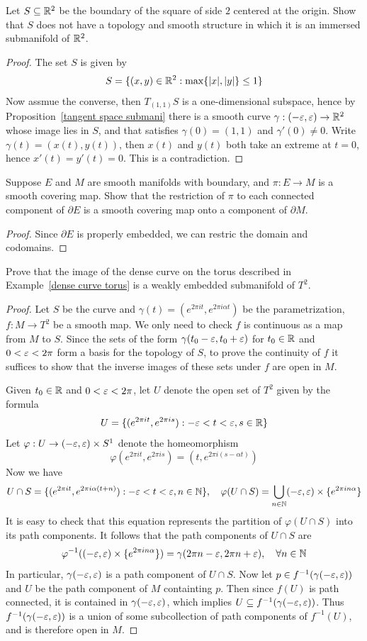 \begin{exercise}
Let $S\subseteq\mathbb{R}^2$ be the boundary of the square of side $2$ centered at the origin. Show that $S$ does not have a topology and smooth structure in which it is an immersed submanifold of $\mathbb{R}^2$.
\end{exercise}
\begin{proof}
The set $S$ is given by
\[S=\{(x,y)\in\mathbb{R}^2:\max\{|x|,|y|\}\leq 1\}\]
Now assmue the converse, then $T_{(1,1)}S$ is a one-dimensional subspace, hence by Proposition~\ref{tangent space submani} there is a smooth curve $\gamma:(-\varepsilon,\varepsilon)\to \mathbb{R}^2$ whose image lies in $S$, and that satisfies $\gamma(0)=(1,1)$ and $\gamma'(0)\neq 0$. Write $\gamma(t)=(x(t),y(t))$, then $x(t)$ and $y(t)$ both take an extreme at $t=0$, hence $x'(t)=y'(t)=0$. This is a contradiction.
\end{proof}
\begin{exercise}
Suppose $E$ and $M$ are smooth manifolds with boundary, and $\pi:E\to M$ is a smooth covering map. Show that the restriction of $\pi$ to each connected component of $\partial E$ is a smooth covering map onto a component of $\partial M$.
\end{exercise}
\begin{proof}
Since $\partial E$ is properly embedded, we can restric the domain and codomains.
\end{proof}
\begin{exercise}
Prove that the image of the dense curve on the torus described in Example~\ref{dense curve torus} is a weakly embedded submanifold of $T^2$.
\end{exercise}
\begin{proof}
Let $S$ be the curve and $\gamma(t)=(e^{2\pi it},e^{2\pi i\alpha t})$ be the parametrization, $f:M\to T^2$ be a smooth map. We only need to check $f$ is continuous as a map from $M$ to $S$. Since the sets of the form $\gamma(t_0-\varepsilon,t_0+\varepsilon)$ for $t_0\in\mathbb{R}$ and $0<\varepsilon<2\pi$ form a basis for the topology of $S$, to prove the continuity of $f$ it suffices to show that the inverse images of these sets under $f$ are open in $M$.\par
Given $t_0\in\mathbb{R}$ and $0<\varepsilon<2\pi$, let $U$ denote the open set of $T^2$ given by the formula
\[U=\{(e^{2\pi it},e^{2\pi is}):-\varepsilon<t<\varepsilon,s\in\mathbb{R}\}\]
Let $\varphi:U\to(-\varepsilon,\varepsilon)\times S^1$ denote the homeomorphism 
\[\varphi(e^{2\pi it},e^{2\pi is})=(t,e^{2\pi i(s-\alpha t)})\]
Now we have
\[U\cap S=\{(e^{2\pi it},e^{2\pi i\alpha(t+n)}):-\varepsilon<t<\varepsilon,n\in\mathbb{N}\},\quad \varphi(U\cap S)=\bigcup_{n\in\mathbb{N}}(-\varepsilon,\varepsilon)\times\{e^{2\pi in\alpha}\}\]
It is easy to check that this equation represents the partition of $\varphi(U\cap S)$ into its path components. It follows that the path components of $U\cap S$ are
\[\varphi^{-1}((-\varepsilon,\varepsilon)\times\{e^{2\pi in\alpha}\})=\gamma(2\pi n-\varepsilon,2\pi n+\varepsilon),\quad\forall n\in\mathbb{N}\]
In particular, $\gamma(-\varepsilon,\varepsilon)$ is a path component of $U\cap S$. Now let $p\in f^{-1}(\gamma(-\varepsilon,\varepsilon))$ and $U$ be the path component of $M$ containting $p$. Then since $f(U)$ is path connected, it is contained in $\gamma(-\varepsilon,\varepsilon)$, which implies $U\subseteq f^{-1}(\gamma(-\varepsilon,\varepsilon))$. Thus $f^{-1}(\gamma(-\varepsilon,\varepsilon))$ is a union of some subcollection of path components of $f^{-1}(U)$, and is therefore open in $M$.
\end{proof}
